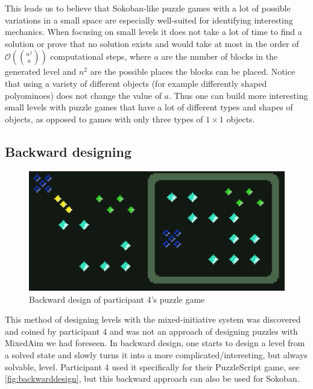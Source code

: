 \begin{description}
This leads us to believe that Sokoban-like puzzle games with a lot of possible variations in a small space are especially well-suited for identifying interesting mechanics. When focusing on small levels it does not take a lot of time to find a solution or prove that no solution exists and would take at most in the order of $\mathcal{O}\left( {n^2 \choose a} \right)$ computational steps, where $a$ are the number of blocks in the generated level and $n^2$ are the possible places the blocks can be placed. Notice that using a variety of different objects (for example differently shaped polyominoes) does not change the value of $a$. Thus one can build more interesting small levels with puzzle games that have a lot of different types and shapes of objects, as opposed to games with only three types of $1 \times 1$ objects. 



\end{description}

\subsection{Backward designing}

\begin{figure}
\centering
\includegraphics[width=.85\textwidth]{figures/backward_design_minotalen.png}
\caption{Backward design of participant 4's puzzle game\label{fig:backwarddesign}}
\end{figure}

This method of designing levels with the mixed-initiative system was discovered and coined by participant 4 and was not an approach of designing puzzles with MixedAim we had foreseen. In backward design, one starts to design a level from a solved state and slowly turns it into a more complicated/interesting, but always solvable, level.
Participant 4 used it specifically for their PuzzleScript game, see \autoref{fig:backwarddesign}, but this backward approach can also be used for Sokoban. 

